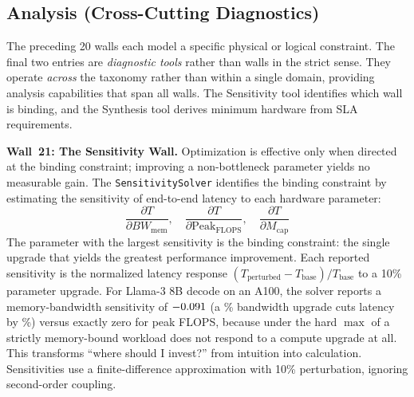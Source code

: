 \documentclass[10pt,twocolumn]{article}
\begin{document}
\subsection{Analysis (Cross-Cutting Diagnostics)}
\label{sec:walls-analysis}

The preceding 20 walls each model a specific physical or logical constraint. The final two entries are \emph{diagnostic tools} rather than walls in the strict sense. They operate \emph{across} the taxonomy rather than within a single domain, providing analysis capabilities that span all walls. The Sensitivity tool identifies which wall is binding, and the Synthesis tool derives minimum hardware from SLA requirements.

\textbf{Wall~21: The Sensitivity Wall.} Optimization is effective only when directed at the binding constraint; improving a non-bottleneck parameter yields no measurable gain. The \texttt{SensitivitySolver} identifies the binding constraint by estimating the sensitivity of end-to-end latency to each hardware parameter:
\begin{equation}
\label{eq:sensitivity}
\frac{\partial T}{\partial BW_{\text{mem}}}, \quad \frac{\partial T}{\partial \text{Peak}_{\text{FLOPS}}}, \quad \frac{\partial T}{\partial M_{\text{cap}}}
\end{equation}
The parameter with the largest sensitivity is the binding constraint: the single upgrade that yields the greatest performance improvement. Each reported sensitivity is the normalized latency response $(T_{\text{perturbed}} - T_{\text{base}}) / T_{\text{base}}$ to a 10\% parameter upgrade. For Llama-3 8B decode on an A100, the solver reports a memory-bandwidth sensitivity of $-0.091$ (a \WallTwentyOnePerturbationPct\% bandwidth upgrade cuts latency by \WallTwentyOneBandwidthCutPct\%) versus exactly zero for peak FLOPS, because under the hard $\max$ of  a strictly memory-bound workload does not respond to a compute upgrade at all. This transforms ``where should I invest?'' from intuition into calculation. Sensitivities use a finite-difference approximation with 10\% perturbation, ignoring second-order coupling.
\end{document}
